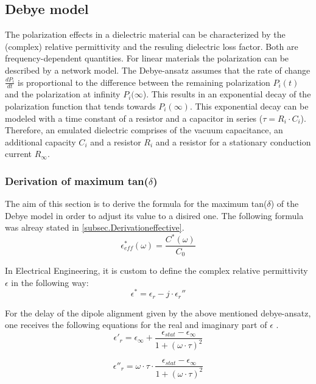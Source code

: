 \subsection{Debye model}
The polarization effects in a dielectric material can be characterized by the (complex) relative permittivity and the resuling dielectric loss factor. Both are frequency-dependent quantities. 
For linear materials the polarization can be described by a network model. The Debye-ansatz assumes that the rate of change $ \frac{dP_i}{dt}$ is proportional to the difference between the remaining polarization $P_i(t)$ and the polarization at infinity $P_i(\infty$). This results in an exponential decay of the polarization function that tends towards $P_i(\infty)$. This exponential decay can be modeled with a time constant of a resistor and a capacitor in series ($\tau=R_i \cdot C_i$). Therefore, an emulated dielectric comprises of the vacuum capacitance, an additional capacity $C_i$ and a resistor $R_i$ and a resistor for a stationary conduction current $R_{\infty}$. 

\subsubsection{Derivation of maximum tan($\delta$)}
The aim of this section is to derive the formula for the maximum tan($\delta$) of the Debye model in order to adjust its value to a disired one. The following formula was alreay stated in \ref{subsec.Derivationeffective}.
\begin{equation}
\epsilon_{eff}^* (\omega) = \frac{C^*(\omega)}{C_0}
\end{equation}

In Electrical Engineering, it is custom to define the  complex relative permittivity $\epsilon$ in the following way: 
\begin{equation}
\epsilon^* = \epsilon_r-j \cdot \epsilon_r''
\end{equation}

For the delay of the dipole alignment given by the above mentioned debye-ansatz, one receives the following equations for the real and imaginary part of $\epsilon$ \cite{Kuchler}. 
\begin{equation}
\epsilon'_r = \epsilon_{\infty} + \frac{\epsilon_{stat}-\epsilon_{\infty}}{1+(\omega \cdot \tau )^2}
\end{equation}

\begin{equation}
\epsilon''_r = \omega \cdot \tau \cdot \frac{\epsilon_{stat}-\epsilon_{\infty}}{1+(\omega \cdot \tau )^2}
\end{equation}

